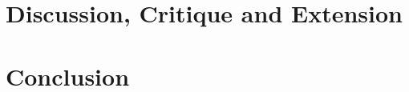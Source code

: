 \documentclass[
  11pt,
]{article}
\begin{document}
\endgroup

\hypertarget{discussion-critique-and-extension}{%
\section{Discussion, Critique and
Extension}\label{discussion-critique-and-extension}}

\hypertarget{conclusion}{%
\section{Conclusion}\label{conclusion}}
\end{document}
